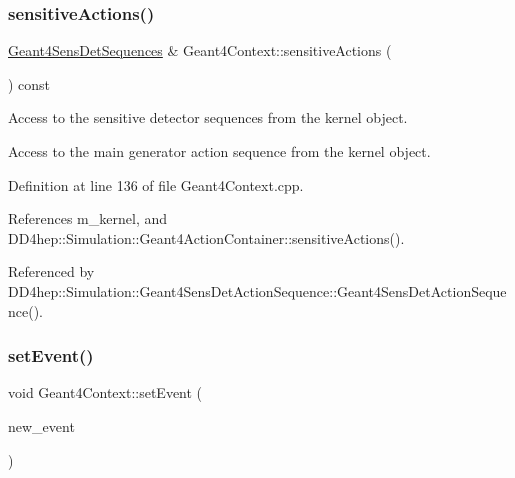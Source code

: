 \hypertarget{class_d_d4hep_1_1_simulation_1_1_geant4_context_a6dc64861f400429806fd23845b9e6f97}{}\label{class_d_d4hep_1_1_simulation_1_1_geant4_context_a6dc64861f400429806fd23845b9e6f97} 
\subsubsection{\texorpdfstring{sensitive\+Actions()}{sensitiveActions()}}
{\footnotesize\ttfamily \hyperlink{class_d_d4hep_1_1_simulation_1_1_geant4_sens_det_sequences}{Geant4\+Sens\+Det\+Sequences} \& Geant4\+Context\+::sensitive\+Actions (\begin{DoxyParamCaption}{ }\end{DoxyParamCaption}) const}



Access to the sensitive detector sequences from the kernel object. 

Access to the main generator action sequence from the kernel object. 

Definition at line 136 of file Geant4\+Context.\+cpp.



References m\+\_\+kernel, and D\+D4hep\+::\+Simulation\+::\+Geant4\+Action\+Container\+::sensitive\+Actions().



Referenced by D\+D4hep\+::\+Simulation\+::\+Geant4\+Sens\+Det\+Action\+Sequence\+::\+Geant4\+Sens\+Det\+Action\+Sequence().

\hypertarget{class_d_d4hep_1_1_simulation_1_1_geant4_context_aa0bb03714fc9c82ed1d07ca804b73553}{}\label{class_d_d4hep_1_1_simulation_1_1_geant4_context_aa0bb03714fc9c82ed1d07ca804b73553} 
\subsubsection{\texorpdfstring{set\+Event()}{setEvent()}}
{\footnotesize\ttfamily void Geant4\+Context\+::set\+Event (\begin{DoxyParamCaption}\item[{\hyperlink{class_d_d4hep_1_1_simulation_1_1_geant4_event}{Geant4\+Event} $\ast$}]{new\+\_\+event }\end{DoxyParamCaption})}



